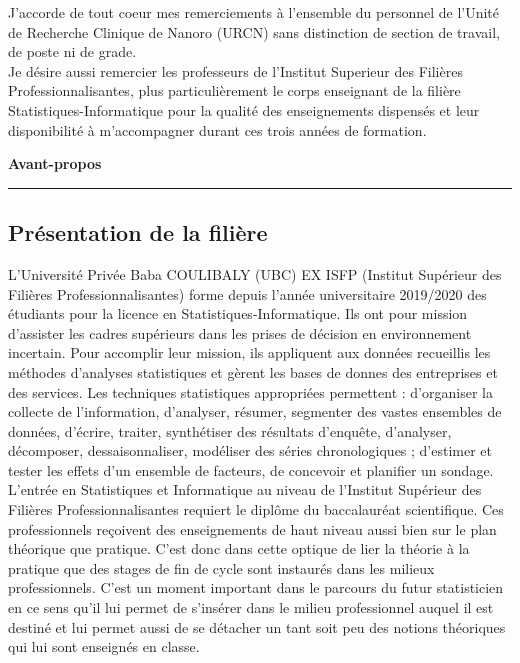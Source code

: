 \documentclass[12pt]{article}
\begin{document}
	
	J'accorde de tout  coeur mes remerciements à l'ensemble du personnel de  l'Unité de Recherche Clinique de Nanoro (URCN) sans distinction de section de travail, de poste ni de grade. \\
	
	
	Je désire aussi remercier les professeurs de l'Institut Superieur des Filières Professionnalisantes, plus particulièrement le corps enseignant de la filière Statistiques-Informatique pour la qualité des enseignements dispensés et leur disponibilité à m'accompagner durant ces trois années de formation.
	
	\newpage
	
	\begin{flushright} %
		\textbf{\Large Avant-propos}
		
		\rule{0.8\linewidth}{0.4pt} %
		\vspace{0.5cm}
		
	\end{flushright}
	
	\subsection{\textbf{Présentation de la filière}}
	
	
	
	L'Université Privée Baba COULIBALY (UBC) EX ISFP (Institut Supérieur des Filières Professionnalisantes) forme depuis l’année universitaire 2019/2020 des étudiants pour la licence en Statistiques-Informatique. Ils ont pour mission d’assister les cadres supérieurs dans les prises de décision en environnement incertain. Pour accomplir leur mission, ils appliquent aux données recueillis les méthodes d’analyses statistiques et gèrent les bases de donnes des entreprises et des services. Les techniques statistiques appropriées permettent : d’organiser la collecte de l’information, d’analyser, résumer,
	segmenter des vastes ensembles de données, d’écrire, traiter, synthétiser des résultats d’enquête, d’analyser, décomposer, dessaisonnaliser, modéliser des séries chronologiques ; d’estimer
	et tester les effets d’un ensemble de facteurs, de concevoir et planifier un sondage. L’entrée en
	Statistiques et Informatique au niveau de l’Institut Supérieur des Filières Professionnalisantes
	requiert le diplôme du baccalauréat scientifique. Ces professionnels reçoivent des enseignements
	de haut niveau aussi bien sur le plan théorique que pratique. C’est donc dans cette optique
	de lier la théorie à la pratique que des stages de fin de cycle sont instaurés dans les milieux
	professionnels. C’est un moment important dans le parcours du futur statisticien en ce sens
	qu’il lui permet de s’insérer dans le milieu professionnel auquel il est destiné et lui permet aussi
	de se détacher un tant soit peu des notions théoriques qui lui sont enseignés en classe.
	
\end{document}
